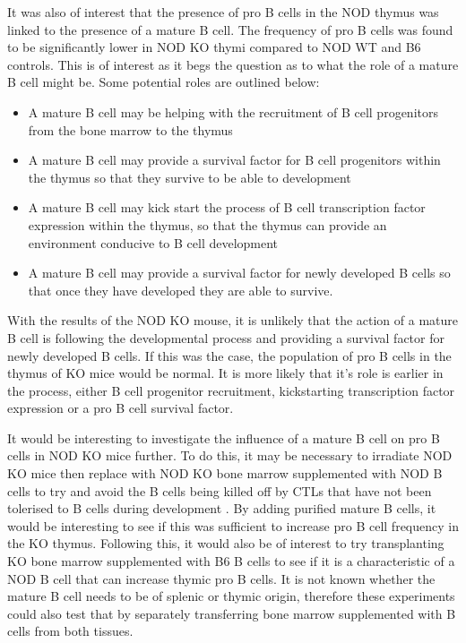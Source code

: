 It was also of interest that the presence of pro B cells in the NOD thymus was linked to the presence of a mature B cell.
The frequency of pro B cells was found to be significantly lower in NOD KO thymi compared to NOD WT and B6 controls.
This is of interest as it begs the question as to what the role of a mature B cell might be.
Some potential roles are outlined below:
\begin{itemize}
\item A mature B cell may be helping with the recruitment of B cell progenitors from the bone marrow to the thymus
\item A mature B cell may provide a survival factor for B cell progenitors within the thymus so that they survive to be able to development
\item A mature B cell may kick start the process of B cell transcription factor expression within the thymus, so that the thymus can provide an environment conducive to B cell development
\item A mature B cell may provide a survival factor for newly developed B cells so that once they have developed they are able to survive.
\end{itemize}

With the results of the NOD KO mouse, it is unlikely that the action of a mature B cell is following the developmental process and providing a survival factor for newly developed B cells.
If this was the case, the population of pro B cells in the thymus of KO mice would be normal.
It is more likely that it's role is earlier in the process, either B cell progenitor recruitment, kickstarting transcription factor expression or a pro B cell survival factor.

It would be interesting to investigate the influence of a mature B cell on pro B cells in NOD KO mice further.
To do this, it may be necessary to irradiate NOD KO mice then replace with NOD KO bone marrow supplemented with NOD B cells to try and avoid the B cells being killed off by CTLs that have not been tolerised to B cells during development \citep{Serreze1998}.
By adding purified mature B cells, it would be interesting to see if this was sufficient to increase pro B cell frequency in the KO thymus.
Following this, it would also be of interest to try transplanting KO bone marrow supplemented with B6 B cells to see if it is a characteristic of a NOD B cell that can increase thymic pro B cells.
It is not known whether the mature B cell needs to be of splenic or thymic origin, therefore these experiments could also test that by separately transferring bone marrow supplemented with B cells from both tissues.


